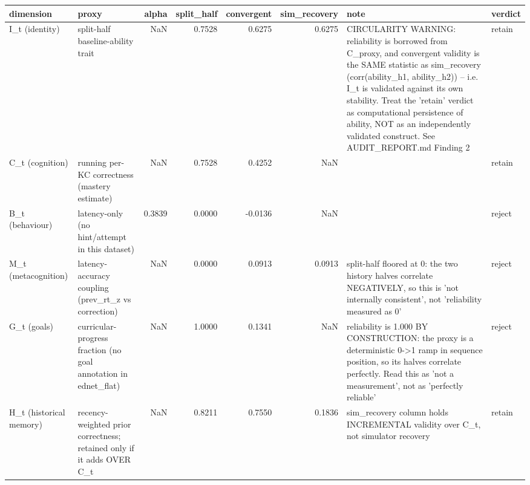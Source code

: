 \begin{tabular}{llrrrrll}
\toprule
dimension & proxy & alpha & split\_half & convergent & sim\_recovery & note & verdict \\
\midrule
I\_t (identity) & split-half baseline-ability trait & NaN & 0.7528 & 0.6275 & 0.6275 & CIRCULARITY WARNING: reliability is borrowed from C\_proxy, and convergent validity is the SAME statistic as sim\_recovery (corr(ability\_h1, ability\_h2)) -- i.e. I\_t is validated against its own stability. Treat the 'retain' verdict as computational persistence of ability, NOT as an independently validated construct. See AUDIT\_REPORT.md Finding 2 & retain \\
C\_t (cognition) & running per-KC correctness (mastery estimate) & NaN & 0.7528 & 0.4252 & NaN &  & retain \\
B\_t (behaviour) & latency-only (no hint/attempt in this dataset) & 0.3839 & 0.0000 & -0.0136 & NaN &  & reject \\
M\_t (metacognition) & latency-accuracy coupling (prev\_rt\_z vs correction) & NaN & 0.0000 & 0.0913 & 0.0913 & split-half floored at 0: the two history halves correlate NEGATIVELY, so this is 'not internally consistent', not 'reliability measured as 0' & reject \\
G\_t (goals) & curricular-progress fraction (no goal annotation in ednet\_flat) & NaN & 1.0000 & 0.1341 & NaN & reliability is 1.000 BY CONSTRUCTION: the proxy is a deterministic 0->1 ramp in sequence position, so its halves correlate perfectly. Read this as 'not a measurement', not as 'perfectly reliable' & reject \\
H\_t (historical memory) & recency-weighted prior correctness; retained only if it adds OVER C\_t & NaN & 0.8211 & 0.7550 & 0.1836 & sim\_recovery column holds INCREMENTAL validity over C\_t, not simulator recovery & retain \\
\bottomrule
\end{tabular}
